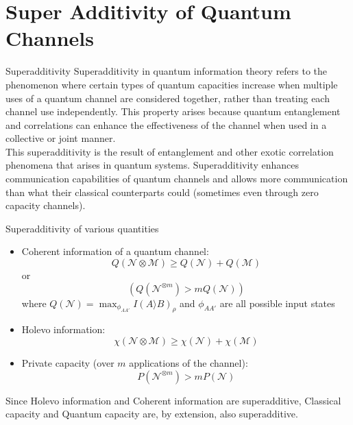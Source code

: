 \section{Super Additivity of Quantum Channels}

\begin{frame}{Superadditivity}
    Superadditivity in quantum information theory refers to the phenomenon where certain types of quantum capacities increase when multiple uses of a
    quantum channel are considered together, rather than treating each channel use independently. This property arises because quantum entanglement and
    correlations can enhance the effectiveness of the channel when used in a collective or joint manner.\\
    This superadditivity is the result of entanglement and other exotic correlation phenomena that arises in quantum systems. Superadditivity enhances
    communication capabilities of quantum channels and allows more communication than what their classical counterparts could (sometimes even through
    zero capacity channels).
\end{frame}

\begin{frame}{Superadditivity of various quantities}
    \begin{itemize}
        \item Coherent information of a quantum channel:
        $$Q(\mathcal{N} \otimes \mathcal{M} ) \geq Q(\mathcal{N} ) + Q(\mathcal{M} )$$
        or $$(Q(\mathcal{N}^{\otimes m}) > mQ(\mathcal{N}))$$
        where $Q(\mathcal{N}) = \max_{\phi_{AA'}}I(A\rangle B)_\rho$ and ${\phi_{AA'}}$ are all possible input states
        \item Holevo information:
        $$\chi (\mathcal{N} \otimes \mathcal{M} ) \geq \chi (\mathcal{N}) + \chi (\mathcal{M})$$
        \item Private capacity (over $m$ applications of the channel):
        $$P(\mathcal{N}^{\otimes m}) > mP(\mathcal{N})$$
    \end{itemize}    
\end{frame}

\begin{frame}
    Since Holevo information and Coherent information are superadditive, Classical capacity and Quantum capacity are, by extension, also superadditive.
\end{frame}
